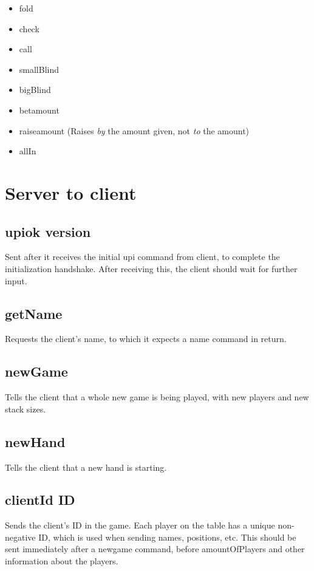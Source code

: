 \documentclass{article}
\begin{document}
\begin{itemize}
\item fold
\item check
\item call
\item smallBlind
\item bigBlind
\item bet\textlangle{}amount\textrangle{} 
\item raise\textlangle{}amount\textrangle{} (Raises \textit{by} the amount given, not \textit{to} the amount)
\item allIn
\end{itemize}

\section{Server to client}

\subsection*{upiok \textlangle{}version\textrangle{}}
Sent after it receives the initial upi command from client, to complete the initialization handshake. After receiving this, the client should wait for further input.

\subsection*{getName}
Requests the client's name, to which it expects a name command in return.

\subsection*{newGame}
Tells the client that a whole new game is being played, with new players and new stack sizes. 

\subsection*{newHand}
Tells the client that a new hand is starting.

\subsection*{clientId \textlangle{}ID\textrangle{}}
Sends the client's ID in the game. Each player on the table has a unique non-negative ID, which is used when sending names, positions, etc. This should be sent immediately after a newgame command, before amountOfPlayers and other information about the players.
\end{document}
